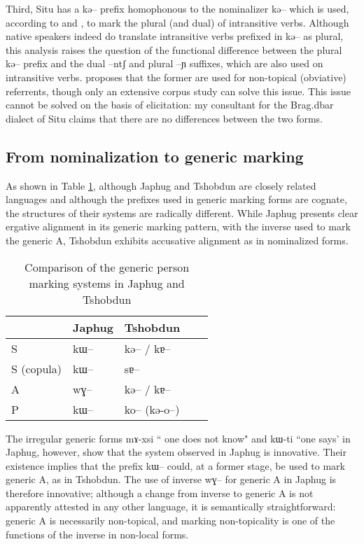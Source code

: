 \documentclass[oldfontcommands,oneside,a4paper,11pt]{article}
\newcommand{\ipa}[1]{{\phon \mbox{#1}}} %
\begin{document}
Third, Situ has a   \ipa{kə--} prefix homophonous to the nominalizer \ipa{kə--} which is used, according to \citealt[218]{linxr93jiarong} and \citet[163]{lin09phd}, to mark the plural (and dual) of intransitive verbs. Although native speakers indeed do translate intransitive verbs prefixed in \ipa{kə--} as plural, this analysis raises the question of the functional difference between the plural \ipa{kə--} prefix and the dual \ipa{--ntʃ}  and plural \ipa{--ɲ} suffixes, which are also used on intransitive verbs. \citet[101-102]{jacques12agreement} proposes that the former are used for non-topical (obviative) referrents, though only an extensive corpus study can solve this issue. This issue cannot be solved on the basis of elicitation: my consultant for the Brag.dbar dialect of Situ claims that there are no differences between the two forms. 


\subsection{From nominalization to generic marking} \label{sec:nmlz2genr}
As shown in Table \ref{tab:genr:jpg:tshobdun}, although Japhug and Tshobdun are closely related languages and although the prefixes used in generic marking forms are cognate, the structures of their systems are radically different. While Japhug presents clear ergative alignment in its generic marking pattern, with the inverse used to mark the generic A, Tshobdun exhibits accusative alignment as in nominalized forms.


\begin{table}
\caption{Comparison of the generic person marking systems in Japhug and Tshobdun} \label{tab:genr:jpg:tshobdun} \centering
\begin{tabular}{lllll}
\toprule
& Japhug & Tshobdun \\
\midrule
S & \ipa{kɯ--}& \ipa{kə--} / \ipa{kɐ--} \\
S (copula) & \ipa{kɯ--} & \ipa{sɐ--} \\
A & \ipa{wɣ--} & \ipa{kə--} / \ipa{kɐ--} \\
P & \ipa{kɯ--} & \ipa{ko--} (\ipa{kə-o--}) \\
\bottomrule
\end{tabular}
\end{table}

The irregular generic  forms \ipa{mɤ-xsi} `` one does not know" and \ipa{kɯ-ti} ``one says'  in Japhug, however, show that the system observed in Japhug is innovative. Their existence  implies that the prefix \ipa{kɯ--} could, at a former stage, be used to mark generic A, as in Tshobdun. The use of inverse \ipa{wɣ--} for generic A in Japhug is therefore innovative; although a change from inverse to generic A is not apparently attested in any other language, it is semantically straightforward: generic A is necessarily non-topical, and marking non-topicality is one of the functions of the inverse in non-local forms.
\end{document}
